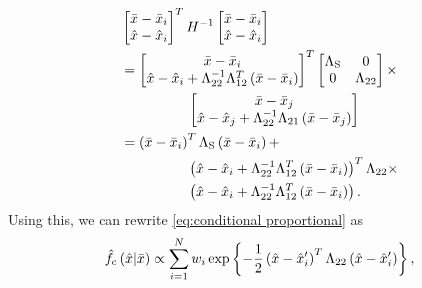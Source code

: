 \begin{align*}
	&\begin{bmatrix} 
		\variableparta - \datapointparta{\indexdata} \\ 
		\variablepartb - \datapointpartb{\indexdata} 
	\end{bmatrix}^T 
	\bandwidthmatrix^{-1}
	\begin{bmatrix} 
		\variableparta - \datapointparta{\indexdata} \\ 
		\variablepartb - \datapointpartb{\indexdata} 
	\end{bmatrix} \\
	&= \begin{bmatrix} 
		\variableparta - \datapointparta{\indexdata} \\ 
		\variablepartb - \datapointpartb{\indexdata} + \bwibr^{-1} \bwiur^T \left(\variableparta - \datapointparta{\indexdata} \right)
	\end{bmatrix}^T 
	\begin{bmatrix} 
		\bwischur  & 0 \\ 
		0 & \bwibr 
	\end{bmatrix} \times \\
	&\superquad \begin{bmatrix}
		\variableparta - \datapointparta{\indexsampling} \\
		\variablepartb - \datapointpartb{\indexsampling} + \bwibr^{-1}\bwibl \left(\variableparta - \datapointparta{\indexsampling} \right)
	\end{bmatrix} \\
	&= \left(\variableparta - \datapointparta{\indexdata}\right)^T 
	\bwischur 
	\left(\variableparta - \datapointparta{\indexdata}\right) + \nonumber \\
	&\superquad \left( \variablepartb - \datapointpartb{\indexdata} + \bwibr^{-1} \bwiur^T \left(\variableparta - \datapointparta{\indexdata} \right) \right)^T
	\bwibr \times \\
	&\superquad \left( \variablepartb - \datapointpartb{\indexdata} + \bwibr^{-1} \bwiur^T \left(\variableparta - \datapointparta{\indexdata} \right) \right).
\end{align*}
Using this, we can rewrite \cref{eq:conditional proportional} as
\begin{equation}
	\label{eq:final conditional hard}
	\hat{f}_{\mathrm{c}}\left( \hat{x} | \bar{x} \right) 
	\propto \sum_{i=1}^{N} w_{i}
	\exp\left\{  -\frac{1}{2} \left( \hat{x} - \hat{x}_{i}' \right)^T \Lambda_{22} \left( \hat{x} - \hat{x}_{i}' \right) \right\},
\end{equation}
